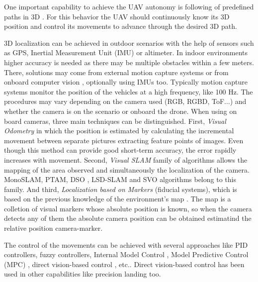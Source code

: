 \documentclass{styles/svproc}
\begin{document}
        
        One important capability to achieve the UAV autonomy is following of predefined paths in 3D \cite{dandrea2015,beul2015,nguyen2014}. For this behavior the UAV should continuously know its 3D position and control its movements to advance through the desired 3D path.

        3D localization can be achieved in outdoor scenarios with the help of sensors such as GPS, Inertial Measurement Unit (IMU) or altimeter. In indoor environments higher accuracy is needed as there may be multiple obstacles within a few meters. There, solutions may come from external motion capture systems \cite{jimenez2014,lupashin2014,michael2010} or from onboard computer vision \cite{wu2013,rodriguezramos2016}, optionally using IMUs too. Typically motion capture systems monitor the position of the vehicles at a high frequency, like 100 Hz. The procedures may vary depending on the camera used (RGB, RGBD, ToF...) and whether the camera is on the scenario or onboard the drone. When using on board cameras, three main techniques can be distinguished. First, \textit{Visual Odometry} in which the position is estimated by calculating the incremental movement between separate pictures extracting feature points of images. Even though this method can provide good short-term accuracy, the error rapidly increases with movement. Second, \textit{Visual SLAM} family of algorithms allows the mapping of the area observed and simultaneously the localization of the camera. MonoSLAM, PTAM, DSO \cite{engel2017}, LSD-SLAM and SVO \cite{forster2014} algorithms belong to this family. And third, \textit{Localization based on Markers} (fiducial systems), which is based on the previous knowledge of the environment's map \cite{apvrille2013}. The map is a colletion of visual markers whose absolute position is known, so when the camera detects any of them the absolute camera position can be obtained estimatind the relative position camera-marker.
	
        The control of the movements can be achieved with several approaches like PID controllers, fuzzy controllers, Internal Model Control \cite{hernandez2013}, Model Predictive Control (MPC) \cite{hernandez2014}, direct vision-based control \cite{nguyen2014}, etc.. Direct vision-based control has been used in other capabilities like precision landing too.
        
\end{document}
